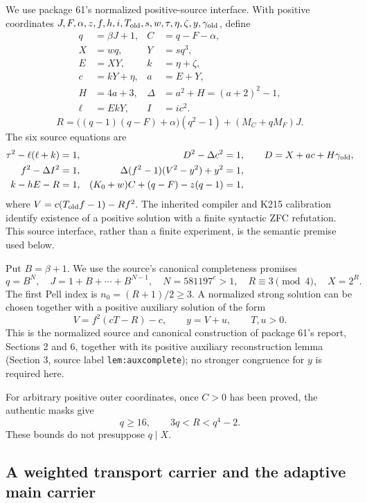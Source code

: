 We use package 61's normalized positive-source interface.  With positive
coordinates $J,F,\alpha,z,f,h,i,T_{\rm old},s,w,\tau,\eta,\zeta,y,
\gamma_{\rm old}$, define
\begin{align*}
 q&=\beta J+1,& C&=q-F-\alpha,\\
 X&=wq,&Y&=sq^3,\\
 E&=XY,& k&=\eta+\zeta,\\
 c&=kY+\eta,&a&=E+Y,\\
 H&=4a+3,&\Delta&=a^2+H=(a+2)^2-1,\\
 \ell&=EkY,&I&=ic^2.
\end{align*}
\[
 R=\big((q-1)(q-F)+\alpha\big)(q^2-1)+(M_C+qM_F)J.
\]
The six source equations are
\begin{align}
 \tau^2-\ell(\ell+k)&=1,&
 D^2-\Delta c^2&=1,\qquad D=X+ac+H\gamma_{\rm old},\label{eq:rt-source-a}\\
 f^2-\Delta I^2&=1,&
 \Delta(f^2-1)(V^2-y^2)+y^2&=1,\label{eq:rt-source-b}\\
 k-hE-R&=1,&
 (K_0+w)C+(q-F)-z(q-1)&=1,\label{eq:rt-source-c}
\end{align}
where $V=c(T_{\rm old}f-1)-Rf^2$.
The inherited compiler and K215 calibration identify existence of a
positive solution with a finite syntactic ZFC refutation.  This source
interface, rather than a finite experiment, is the semantic premise used
below.

Put $B=\beta+1$.  We use the source's canonical completeness promises
\[
 q=B^N,\quad J=1+B+\cdots+B^{N-1},\quad
 N=581197^e>1,\quad R\equiv3\pmod4,\quad X=2^R.
\]
The first Pell index is $n_0=(R+1)/2\ge3$.  A normalized strong solution
can be chosen together with a positive auxiliary solution of the form
\[
 V=f^2(cT-R)-c,\qquad y=V+u,\qquad T,u>0.
\]
This is the normalized source and canonical construction of package 61's report, Sections 2 and 6, together with its positive auxiliary reconstruction lemma (Section 3, source label \texttt{lem:auxcomplete});
no stronger congruence for $y$ is required here.

For arbitrary positive outer coordinates, once $C>0$ has been proved,
the authentic masks give
\begin{equation}
 q\ge16,\qquad 3q<R<q^4-2.\label{eq:rt-Rbound}
\end{equation}
These bounds do not presuppose $q\mid X$.

\subsection{A weighted transport carrier and the adaptive main carrier}

